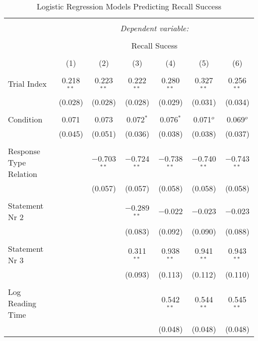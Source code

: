 
\begin{table}
\centering
  \caption{Logistic Regression Models Predicting Recall Success}
  \label{table:main}
\small
\renewcommand{\arraystretch}{0.45}
\begin{tabular}{@{\extracolsep{5pt}}lcccccc}
\\[-1.8ex]\hline
\hline \\[-1.8ex]
 & \multicolumn{6}{c}{\textit{Dependent variable:}} \\
\cline{2-7}
\\[-1.8ex] & \multicolumn{6}{c}{Recall Sucess} \\
\\[-1.8ex] & (1) & (2) & (3) & (4) & (5) & (6)\\
\hline \\[-1.8ex]
 Trial Index & 0.218$^{**}$ & 0.223$^{**}$ & 0.222$^{**}$ & 0.280$^{**}$ & 0.327$^{**}$ & 0.256$^{**}$ \\
  & (0.028) & (0.028) & (0.028) & (0.029) & (0.031) & (0.034) \\
  & & & & & & \\
 Condition & 0.071 & 0.073 & 0.072$^{*}$ & 0.076$^{*}$ & 0.071$^{o}$ & 0.069$^{o}$ \\
  & (0.045) & (0.051) & (0.036) & (0.038) & (0.038) & (0.037) \\
  & & & & & & \\
 Response Type Relation &  & $-$0.703$^{**}$ & $-$0.724$^{**}$ & $-$0.738$^{**}$ & $-$0.740$^{**}$ & $-$0.743$^{**}$ \\
  &  & (0.057) & (0.057) & (0.058) & (0.058) & (0.058) \\
  & & & & & & \\
 Statement Nr 2 &  &  & $-$0.289$^{**}$ & $-$0.022 & $-$0.023 & $-$0.023 \\
  &  &  & (0.083) & (0.092) & (0.090) & (0.088) \\
  & & & & & & \\
 Statement Nr 3 &  &  & 0.311$^{**}$ & 0.938$^{**}$ & 0.941$^{**}$ & 0.943$^{**}$ \\
  &  &  & (0.093) & (0.113) & (0.112) & (0.110) \\
  & & & & & & \\
 Log Reading Time &  &  &  & 0.542$^{**}$ & 0.544$^{**}$ & 0.545$^{**}$ \\
  &  &  &  & (0.048) & (0.048) & (0.048) \\

\end{tabular}
\end{table}
